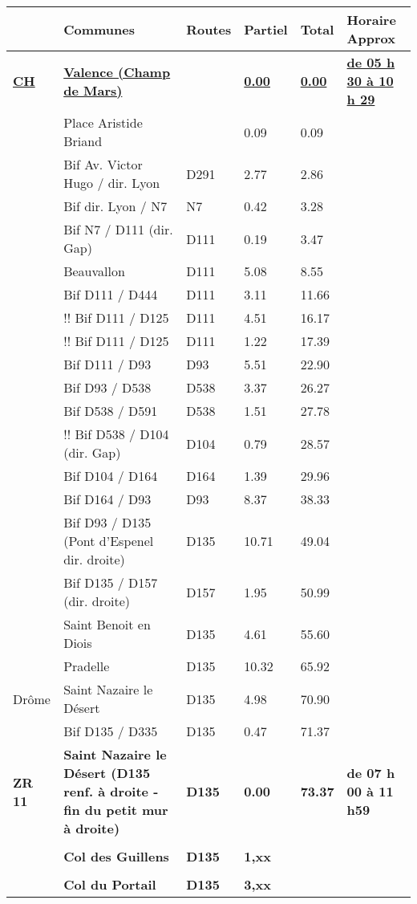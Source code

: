 \documentclass{article}%
\begin{document}
\begin{longtable}{p{2.25cm}|p{6.7cm}|p{2.0cm}|p{1.5cm}|p{1.5cm}|p{3.5cm}}%
\hline%
&Communes&Routes&Partiel&Total&Horaire Approx\\%
\hline%
\endhead%
\endfoot%
\endlastfoot%
\textbf{\underline{﻿CH}}&\textbf{\underline{ Valence (Champ de Mars) }}& &\textbf{\underline{0.00}}&\textbf{\underline{0.00}}&\textbf{\underline{de 05 h 30 à 10 h 29}}\\%
 &Place Aristide Briand & &0.09&0.09& \\%
 &Bif Av. Victor Hugo / dir. Lyon&D291&2.77&2.86& \\%
 &Bif dir. Lyon / N7&N7 &0.42&3.28& \\%
 &Bif N7 / D111 (dir. Gap)&D111&0.19&3.47& \\%
 &Beauvallon &D111&5.08&8.55& \\%
 &Bif D111 / D444 &D111&3.11&11.66& \\%
 &!! Bif D111 / D125&D111&4.51&16.17& \\%
 &!! Bif D111 / D125&D111&1.22&17.39& \\%
 &Bif D111 / D93&D93&5.51&22.90& \\%
 &Bif D93 / D538&D538&3.37&26.27& \\%
 &Bif D538 / D591 &D538&1.51&27.78& \\%
 &!! Bif D538 / D104 (dir. Gap) &D104&0.79&28.57& \\%
 &Bif D104 / D164 &D164&1.39&29.96& \\%
 &Bif D164 / D93&D93&8.37&38.33& \\%
 &Bif D93 / D135 (Pont d'Espenel dir. droite)&D135 &10.71&49.04& \\%
 &Bif D135 / D157 (dir. droite)&D157&1.95&50.99& \\%
 &Saint Benoit en Diois&D135&4.61&55.60& \\%
 &Pradelle&D135&10.32&65.92& \\%
Drôme &Saint Nazaire le Désert&D135&4.98&70.90& \\%
 &Bif D135 / D335&D135&0.47&71.37& \\%
\textbf{ ZR 11 }&\textbf{Saint Nazaire le Désert (D135 renf. à droite - fin du petit mur à droite)}&\textbf{D135}&\textbf{0.00}&\textbf{73.37}&\textbf{de 07 h 00 à 11 h59}\\%
 & & & & & \\%
 &\textbf{Col des Guillens}&\textbf{D135}&\textbf{1,xx}& & \\%
 & & & & & \\%
 &\textbf{Col du Portail}&\textbf{D135}&\textbf{3,xx}& & \\%

\end{longtable}
\end{document}
